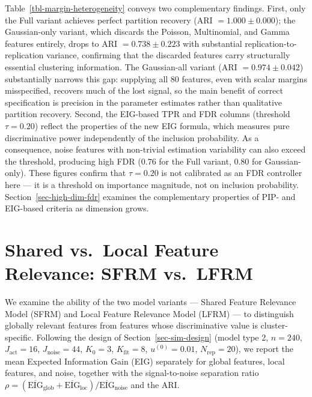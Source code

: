 \documentclass[
  letterpaper,
  DIV=11,
  numbers=noendperiod]{scrartcl}
\begin{document}
Table~\ref{tbl-margin-heterogeneity} conveys two complementary findings.
First, only the Full variant achieves perfect partition recovery (ARI
\(= 1.000 \pm 0.000\)); the Gaussian-only variant, which discards the
Poisson, Multinomial, and Gamma features entirely, drops to ARI
\(= 0.738 \pm 0.223\) with substantial replication-to-replication
variance, confirming that the discarded features carry structurally
essential clustering information. The Gaussian-all variant (ARI
\(= 0.974 \pm 0.042\)) substantially narrows this gap: supplying all 80
features, even with scalar margins misspecified, recovers much of the
lost signal, so the main benefit of correct specification is precision
in the parameter estimates rather than qualitative partition recovery.
Second, the EIG-based TPR and FDR columns (threshold \(\tau = 0.20\))
reflect the properties of the new EIG formula, which measures pure
discriminative power independently of the inclusion probability. As a
consequence, noise features with non-trivial estimation variability can
also exceed the threshold, producing high FDR (\(0.76\) for the Full
variant, \(0.80\) for Gaussian-only). These figures confirm that
\(\tau = 0.20\) is not calibrated as an FDR controller here --- it is a
threshold on importance magnitude, not on inclusion probability.
Section~\ref{sec-high-dim-fdr} examines the complementary properties of
PIP- and EIG-based criteria as dimension grows.

\section{Shared vs.~Local Feature Relevance: SFRM
vs.~LFRM}\label{sec-sfrm-lfrm}

We examine the ability of the two model variants --- Shared Feature
Relevance Model (SFRM) and Local Feature Relevance Model (LFRM) --- to
distinguish globally relevant features from features whose
discriminative value is cluster-specific. Following the design of
Section~\ref{sec-sim-design} (model type 2, \(n = 240\),
\(J_{\text{act}} = 16\), \(J_{\text{noise}} = 44\), \(K_0 = 3\),
\(K_{\text{fit}} = 8\), \(u^{(0)} = 0.01\), \(N_{\text{rep}} = 20\)), we
report the mean Expected Information Gain (EIG) separately for global
features, local features, and noise, together with the signal-to-noise
separation ratio
\(\rho = (\overline{\text{EIG}}_{\text{glob}} + \overline{\text{EIG}}_{\text{loc}}) / \overline{\text{EIG}}_{\text{noise}}\)
and the ARI.
\end{document}
